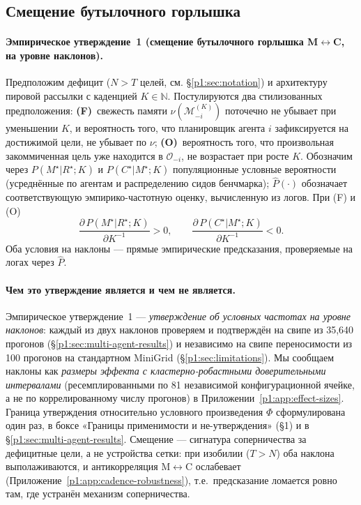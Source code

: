\documentclass{article}
\begin{document}
\subsection{Смещение бутылочного горлышка}
\label{p1:sec:shift}

\paragraph{Эмпирическое утверждение~1 (смещение бутылочного горлышка M$\leftrightarrow$C, на уровне наклонов).}
Предположим дефицит ($N > T$ целей, см. \S\ref{p1:sec:notation}) и
архитектуру пировой рассылки с каденцией $K \in \mathbb{N}$. Постулируются два
стилизованных предположения:
\textbf{(F)}~свежесть памяти $\nu(\mathcal{M}_{-i}^{(K)})$
поточечно не убывает при уменьшении $K$, и вероятность того, что
планировщик агента $i$ зафиксируется на достижимой цели, не убывает по
$\nu$;
\textbf{(O)}~вероятность того, что произвольная закоммиченная цель
уже находится в $\mathcal{O}_{-i}$, не возрастает при росте $K$.
Обозначим через $P(M^\star|R^\star;K)$ и $P(C^\star|M^\star;K)$
популяционные условные вероятности (усреднённые по агентам и
распределению сидов бенчмарка); $\hat{P}(\cdot)$ обозначает
соответствующую эмпирико-частотную оценку, вычисленную из логов. При
(F) и (O)
\[
\frac{\partial\, P(M^\star|R^\star;K)}{\partial K^{-1}} > 0,
\qquad
\frac{\partial\, P(C^\star|M^\star;K)}{\partial K^{-1}} < 0.
\]
Оба условия на наклоны --- прямые эмпирические предсказания,
проверяемые на логах через $\hat{P}$.

\paragraph{Чем это утверждение является и чем не является.}
Эмпирическое утверждение~1 --- \emph{утверждение об условных частотах на уровне наклонов}: каждый из двух наклонов проверяем и подтверждён на свипе из 35{,}640 прогонов (\S\ref{p1:sec:multi-agent-results}) и независимо на свипе переносимости из 100 прогонов на стандартном MiniGrid (\S\ref{p1:sec:limitations}). Мы сообщаем наклоны как \emph{размеры эффекта с кластерно-робастными доверительными интервалами} (ресемплированными по 81 независимой конфигурационной ячейке, а не по коррелированному числу прогонов) в Приложении~\ref{p1:app:effect-sizes}. Граница утверждения относительно условного произведения $\Phi$ сформулирована один раз, в боксе «Границы применимости и не-утверждения» (\S1) и в \S\ref{p1:sec:multi-agent-results}. Смещение --- сигнатура соперничества за дефицитные цели, а не устройства сетки: при изобилии ($T{>}N$) оба наклона выполаживаются, и антикорреляция M$\leftrightarrow$C ослабевает (Приложение~\ref{p1:app:cadence-robustness}), т.е.\ предсказание ломается ровно там, где устранён механизм соперничества.
\end{document}
